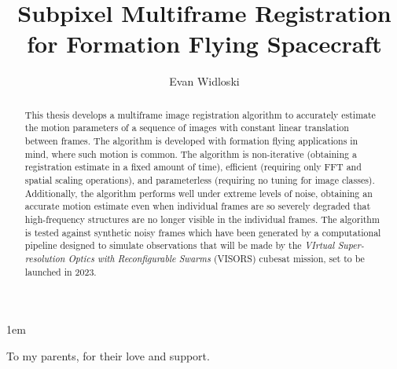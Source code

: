 \documentclass[tocnosub,noragright,centerchapter,12pt]{uiucecethesis09}
\title{Subpixel Multiframe Registration for Formation Flying Spacecraft}
\author{Evan Widloski}
\begin{document}
\newcommand{\green}[1]{{\color{green}#1}}
\newcommand{\red}[1]{{\color{red}#1}}
\newcommand{\blue}[1]{{\color{blue}#1}}
\newcommand{\svar}[1]{{(\text{#1})}}
\newcommand{\eqcomment}[1]{\parbox[c]{0.4\linewidth}{\color{gray}#1}}
\newcommand{\eqlinecomment}[1]{\hphantom{{}={}}\parbox{\linewidth}{\color{gray}#1}}
\newcommand{\ip}[2]{\left\langle #1,\,#2 \right\rangle}
\allowdisplaybreaks


%

%
\maketitle

\parindent 1em%

\frontmatter

%


\begin{abstract}
  This thesis develops a multiframe image registration algorithm to accurately estimate the motion parameters of a sequence of images with constant linear translation between frames.  The algorithm is developed with formation flying applications in mind, where such motion is common.  The algorithm is non-iterative (obtaining a registration estimate in a fixed amount of time), efficient (requiring only FFT and spatial scaling operations), and parameterless (requiring no tuning for image classes).  Additionally, the algorithm performs well under extreme levels of noise, obtaining an accurate motion estimate even when individual frames are so severely degraded that high-frequency structures are no longer visible in the individual frames.  The algorithm is tested against synthetic noisy frames which have been generated by a computational pipeline designed to simulate observations that will be made by the \emph{VIrtual Super-resolution Optics with Reconfigurable Swarms} (VISORS) cubesat mission, set to be launched in 2023.
\end{abstract}


%
\begin{dedication}
To my parents, for their love and support.
\end{dedication}
\end{document}

